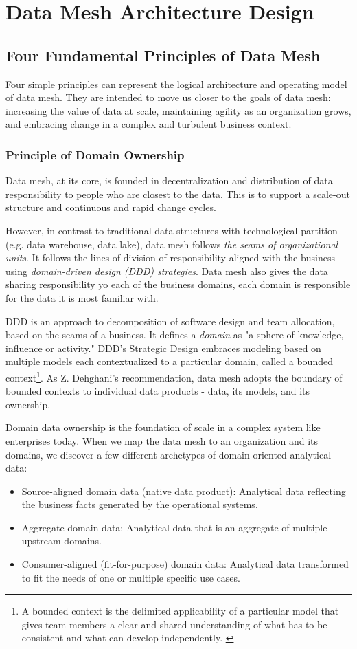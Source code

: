 \documentclass[12pt, a4paper]{book}
\begin{document}
\chapter{Data Mesh Architecture Design}
\section{Four Fundamental Principles of Data Mesh}\label{4principles}
Four simple principles can represent the logical architecture and operating model of data mesh. They are intended to move us closer to the goals of data mesh: increasing the value of data at scale, maintaining agility as an organization grows, and embracing change in a complex and turbulent business context.

\subsection{Principle of Domain Ownership}
Data mesh, at its core, is founded in decentralization and distribution of data responsibility to people who are closest to the data. This is to support a scale-out structure and continuous and rapid change cycles.

However, in contrast to traditional data structures with technological partition (e.g. data warehouse, data lake), data mesh follows \textit{the seams of organizational units}. It follows the lines of division of responsibility aligned with the business using \textit{domain-driven design (DDD) strategies}. Data mesh also gives the data sharing responsibility yo each of the business domains, each domain is responsible for the data it is most familiar with.

DDD is an approach to decomposition of software design and team allocation, based on the seams of a business. It defines a \textit{domain} as "a sphere of knowledge, influence or activity." DDD’s Strategic Design embraces modeling based on multiple models each contextualized to a particular domain, called a bounded context\footnote{A bounded context is the delimited applicability of a particular model that gives team members a clear and shared understanding of what has to be consistent and what can develop independently. \cite{dddevan}}. As Z. Dehghani's recommendation, data mesh adopts the boundary of bounded contexts to individual data products - data, its models, and its ownership.

Domain data ownership is the foundation of scale in a complex system like enterprises today. When we map the data mesh to an organization and its domains, we discover a few different archetypes of domain-oriented analytical data:
	\begin{itemize}
		\item Source-aligned domain data (native data product): Analytical data reflecting the business facts generated by the operational systems.
		\item Aggregate domain data: Analytical data that is an aggregate of multiple upstream domains.
		\item Consumer-aligned (fit-for-purpose) domain data: Analytical data transformed to fit the needs of one or multiple specific use cases.
	\end{itemize}
\end{document}
